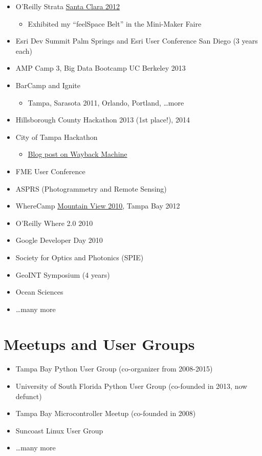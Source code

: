 \documentclass[12pt]{article}
\newenvironment{mitemize}
               {%
                 \setlength{\parskip}{3pt}
                 \setlength{\itemsep}{2.5pt plus 1pt}
                 \begin{itemize}}
               {\end{itemize}}
\begin{document}
\begin{mitemize}
  \item O'Reilly Strata \href{https://conferences.oreilly.com/strata/strata2012}{Santa Clara 2012}
    \begin{mitemize}
    \item Exhibited my ``feelSpace Belt'' in the Mini-Maker Faire
    \end{mitemize}
  \item Esri Dev Summit Palm Springs and Esri User Conference San Diego (3 years each)
  \item AMP Camp 3, Big Data Bootcamp UC Berkeley 2013
  \item BarCamp and Ignite
    \begin{mitemize}
    \item Tampa, Sarasota 2011, Orlando, Portland, \ldots more
    \end{mitemize}
  \item Hillsborough County Hackathon 2013 (1st place!), 2014
  \item City of Tampa Hackathon
    \begin{mitemize}
    \item \href{https://web.archive.org/web/20120808120046/http://www.weogeo.com/blog/City_of_Tampa_Mayors_Hackathon.html}{Blog post on Wayback Machine}
    \end{mitemize}
  \item FME User Conference
  \item ASPRS (Photogrammetry and Remote Sensing)
  \item WhereCamp \href{https://conferences.oreilly.com/where/where2010/public/schedule/detail/14268}{Mountain View 2010}, Tampa Bay 2012
  \item O'Reilly Where 2.0 2010
  \item Google Developer Day 2010
  \item Society for Optics and Photonics (SPIE)
  \item GeoINT Symposium (4 years)
  \item Ocean Sciences
  \item \ldots many more
\end{mitemize}

\section*{Meetups and User Groups} \hfill

\begin{mitemize}
\item Tampa Bay Python User Group (co-organizer from 2008-2015)
\item University of South Florida Python User Group (co-founded in 2013, now defunct)
\item Tampa Bay Microcontroller Meetup (co-founded in 2008)
\item Suncoast Linux User Group
\item \ldots many more
\end{mitemize}
\end{document}
